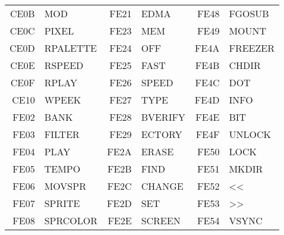 {\begin{center}
\begin{tabular}{|rp{2.2cm}|rp{2.2cm}|rp{2.2cm}|}
CE0B & MOD        &FE21 & EDMA       &FE48 & FGOSUB     \\
CE0C & PIXEL      &FE23 & MEM        &FE49 & MOUNT      \\
CE0D & RPALETTE   &FE24 & OFF        &FE4A & FREEZER    \\
CE0E & RSPEED     &FE25 & FAST       &FE4B & CHDIR      \\
CE0F & RPLAY      &FE26 & SPEED      &FE4C & DOT        \\
CE10 & WPEEK      &FE27 & TYPE       &FE4D & INFO       \\
FE02 & BANK       &FE28 & BVERIFY    &FE4E & BIT        \\
FE03 & FILTER     &FE29 & ECTORY     &FE4F & UNLOCK     \\
FE04 & PLAY       &FE2A & ERASE      &FE50 & LOCK       \\
FE05 & TEMPO      &FE2B & FIND       &FE51 & MKDIR      \\
FE06 & MOVSPR     &FE2C & CHANGE     &FE52 & <<         \\
FE07 & SPRITE     &FE2D & SET        &FE53 & >>         \\
FE08 & SPRCOLOR   &FE2E & SCREEN     &FE54 & VSYNC      \\
\hline
\end{tabular}
\end{center}
}
